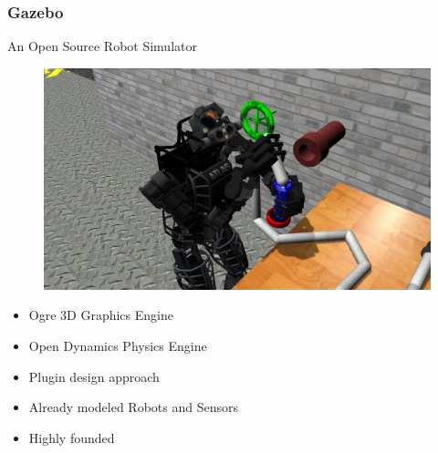 \documentclass{beamer}
\begin{document}
\begin{frame}
\frametitle{Gazebo}
\begin{multicols}{2}
An Open Source Robot Simulator
\begin{figure}
\includegraphics[scale=0.125]{pics/gazebo.jpg}
\end{figure}
\begin{itemize}
\item Ogre 3D Graphics Engine %
\item Open Dynamics Physics Engine %
\item Plugin design approach
\item Already modeled Robots and Sensors %
\item Highly founded
\end{itemize}
\end{multicols}
\end{frame}
\end{document}
